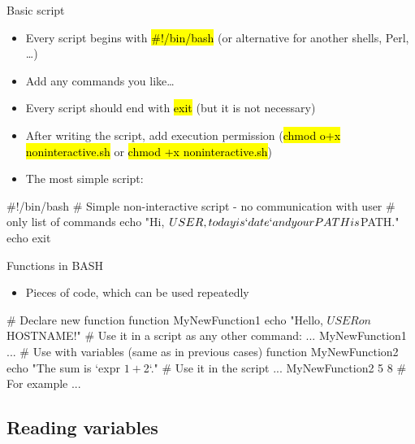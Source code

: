 \documentclass[compress, ucs, xelatex, 11pt, xcolor=svgnames,
  hyperref={
    bookmarks=true,
    unicode=true,
    colorlinks=true,
    pdftitle={Linux, command line and MetaCentrum},
    plainpages=false,
    pdfauthor={Vojtech Zeisek},
    pdfsubject={Course about use of Linux command line, writing shell scripts and using MetaCentrum of CESNET},
    pdfcreator={XeLaTeX},
    pdfkeywords={Linux, GNU, BASH, shell, command line, MetaCentrum},
    linkcolor=Red,
    anchorcolor=Blue,
    citecolor=Purple,
    filecolor=DodgerBlue,
    menucolor=DarkOrchid,
    urlcolor=DeepSkyBlue,
    pdftex},
  url={hyphens, lowtilde} %
  ]{beamer}
\renewcommand{\texttt}[1]{\hl{\ttfamily #1}}
\begin{document}
\begin{frame}[fragile]{Basic script}
\begin{itemize}
 \item Every script begins with \texttt{\#!/bin/bash} (or alternative for another shells, Perl, \ldots)
 \item Add any commands you like\ldots
 \item Every script should end with \texttt{exit} (but it is not necessary)
 \item After writing the script, add execution permission (\texttt{chmod o+x noninteractive.sh} or \texttt{chmod +x noninteractive.sh})
 \item The most simple script:
\end{itemize}
  \begin{bashcode}
    #!/bin/bash
    # Simple non-interactive script - no communication with user
    # only list of commands
    echo "Hi, $USER, today is `date` and your PATH is $PATH."
    echo
    exit
  \end{bashcode}
\end{frame}

\begin{frame}[fragile]{Functions in BASH}
  \begin{itemize}
    \item Pieces of code, which can be used repeatedly
  \end{itemize}
  \begin{bashcode}
    # Declare new function
    function MyNewFunction1 {
      echo "Hello, $USER on $HOSTNAME!"
      }
    # Use it in a script as any other command:
    ...
    MyNewFunction1
    ...
    # Use with variables (same as in previous cases)
    function MyNewFunction2 {
      echo "The sum is `expr $1 + $2`."
      }
    # Use it in the script
    ...
    MyNewFunction2 5 8 # For example
    ...
  \end{bashcode}
\end{frame}

\subsection{Reading variables}
\end{document}
